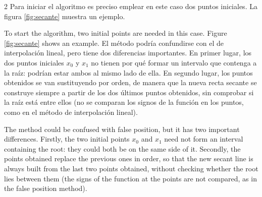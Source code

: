\begin{paracol}{2}
Para iniciar el algoritmo es preciso emplear en este caso dos puntos iniciales. La figura \ref{fig:secante} muestra un ejemplo.

\switchcolumn
To start the algorithm, two initial points are needed in this case. Figure \ref{fig:secante} shows an example.
\switchcolumn
El método podría confundirse con el de interpolación lineal, pero tiene dos diferencias importantes. En primer lugar, los dos puntos iniciales $x_0$ y $x_1$ no tienen por qué formar un intervalo que contenga a la raíz: podrían estar ambos al mismo lado de ella. En segundo lugar, los puntos obtenidos se van sustituyendo por orden, de manera que la nueva recta secante se construye siempre a partir de los dos últimos puntos obtenidos, sin comprobar si la raíz está entre ellos (no se comparan los signos de la función en los puntos, como en el método de interpolación lineal).

\switchcolumn
The method could be confused with false position, but it has two important differences. Firstly, the two initial points $x_0$ and $x_1$ need not form an interval containing the root: they could both be on the same side of it. Secondly, the points obtained replace the previous ones in order, so that the new secant line is always built from the last two points obtained, without checking whether the root lies between them (the signs of the function at the points are not compared, as in the false position method).

\end{paracol}

